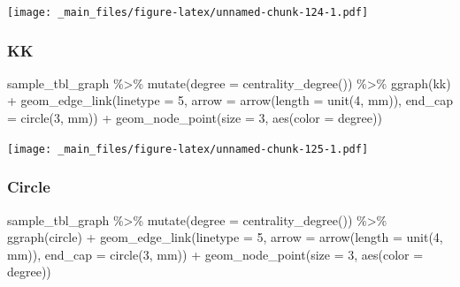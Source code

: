 \documentclass[
]{book}
\newenvironment{Shaded}{\begin{snugshade}}{\end{snugshade}}
\newcommand{\AttributeTok}[1]{\textcolor[rgb]{0.77,0.63,0.00}{#1}}
\newcommand{\DecValTok}[1]{\textcolor[rgb]{0.00,0.00,0.81}{#1}}
\newcommand{\FunctionTok}[1]{\textcolor[rgb]{0.00,0.00,0.00}{#1}}
\newcommand{\NormalTok}[1]{#1}
\newcommand{\SpecialCharTok}[1]{\textcolor[rgb]{0.00,0.00,0.00}{#1}}
\newcommand{\StringTok}[1]{\textcolor[rgb]{0.31,0.60,0.02}{#1}}
\begin{document}
\texttt{[image: \_main\_files/figure-latex/unnamed-chunk-124-1.pdf]}

\hypertarget{kk}{%
\subsubsection{KK}\label{kk}}

\begin{Shaded}
\begin{Highlighting}[]
\NormalTok{sample\_tbl\_graph }\SpecialCharTok{\%\textgreater{}\%} 
  \FunctionTok{mutate}\NormalTok{(}\AttributeTok{degree =} \FunctionTok{centrality\_degree}\NormalTok{()) }\SpecialCharTok{\%\textgreater{}\%} 
  \FunctionTok{ggraph}\NormalTok{(}\StringTok{\textquotesingle{}kk\textquotesingle{}}\NormalTok{) }\SpecialCharTok{+} 
  \FunctionTok{geom\_edge\_link}\NormalTok{(}\AttributeTok{linetype =} \DecValTok{5}\NormalTok{,}
                 \AttributeTok{arrow =} \FunctionTok{arrow}\NormalTok{(}\AttributeTok{length =} \FunctionTok{unit}\NormalTok{(}\DecValTok{4}\NormalTok{, }\StringTok{\textquotesingle{}mm\textquotesingle{}}\NormalTok{)), }
                   \AttributeTok{end\_cap =} \FunctionTok{circle}\NormalTok{(}\DecValTok{3}\NormalTok{, }\StringTok{\textquotesingle{}mm\textquotesingle{}}\NormalTok{)) }\SpecialCharTok{+} 
  \FunctionTok{geom\_node\_point}\NormalTok{(}\AttributeTok{size =} \DecValTok{3}\NormalTok{, }\FunctionTok{aes}\NormalTok{(}\AttributeTok{color =}\NormalTok{ degree))}
\end{Highlighting}
\end{Shaded}

\texttt{[image: \_main\_files/figure-latex/unnamed-chunk-125-1.pdf]}

\hypertarget{circle}{%
\subsubsection{Circle}\label{circle}}

\begin{Shaded}
\begin{Highlighting}[]
\NormalTok{sample\_tbl\_graph }\SpecialCharTok{\%\textgreater{}\%} 
  \FunctionTok{mutate}\NormalTok{(}\AttributeTok{degree =} \FunctionTok{centrality\_degree}\NormalTok{()) }\SpecialCharTok{\%\textgreater{}\%} 
  \FunctionTok{ggraph}\NormalTok{(}\StringTok{\textquotesingle{}circle\textquotesingle{}}\NormalTok{) }\SpecialCharTok{+} 
  \FunctionTok{geom\_edge\_link}\NormalTok{(}\AttributeTok{linetype =} \DecValTok{5}\NormalTok{,}
                 \AttributeTok{arrow =} \FunctionTok{arrow}\NormalTok{(}\AttributeTok{length =} \FunctionTok{unit}\NormalTok{(}\DecValTok{4}\NormalTok{, }\StringTok{\textquotesingle{}mm\textquotesingle{}}\NormalTok{)), }
                   \AttributeTok{end\_cap =} \FunctionTok{circle}\NormalTok{(}\DecValTok{3}\NormalTok{, }\StringTok{\textquotesingle{}mm\textquotesingle{}}\NormalTok{)) }\SpecialCharTok{+} 
  \FunctionTok{geom\_node\_point}\NormalTok{(}\AttributeTok{size =} \DecValTok{3}\NormalTok{, }\FunctionTok{aes}\NormalTok{(}\AttributeTok{color =}\NormalTok{ degree))}
\end{Highlighting}
\end{Shaded}
\end{document}
